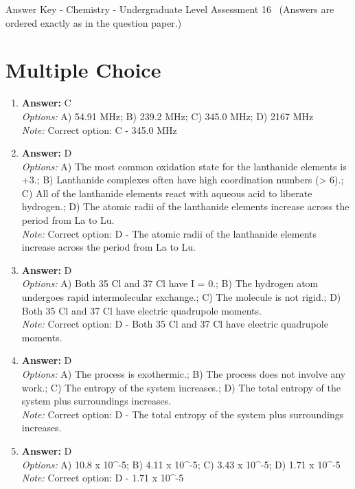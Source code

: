 \documentclass[12pt]{article}
\begin{document}
\begin{center}
Answer Key - Chemistry - Undergraduate Level Assessment 16 \
\small (Answers are ordered exactly as in the question paper.)
\end{center}

\section*{Multiple Choice}
\begin{enumerate}[label=\arabic*.]
\item \textbf{Answer:} C
\\ \textit{Options:} A) 54.91 MHz; B) 239.2 MHz; C) 345.0 MHz; D) 2167 MHz
\\ \textit{Note:} Correct option: C - 345.0 MHz
\item \textbf{Answer:} D
\\ \textit{Options:} A) The most common oxidation state for the lanthanide elements is +3.; B) Lanthanide complexes often have high coordination numbers (\textgreater{} 6).; C) All of the lanthanide elements react with aqueous acid to liberate hydrogen.; D) The atomic radii of the lanthanide elements increase across the period from La to Lu.
\\ \textit{Note:} Correct option: D - The atomic radii of the lanthanide elements increase across the period from La to Lu.
\item \textbf{Answer:} D
\\ \textit{Options:} A) Both 35 Cl and 37 Cl have I = 0.; B) The hydrogen atom undergoes rapid intermolecular exchange.; C) The molecule is not rigid.; D) Both 35 Cl and 37 Cl have electric quadrupole moments.
\\ \textit{Note:} Correct option: D - Both 35 Cl and 37 Cl have electric quadrupole moments.
\item \textbf{Answer:} D
\\ \textit{Options:} A) The process is exothermic.; B) The process does not involve any work.; C) The entropy of the system increases.; D) The total entropy of the system plus surroundings increases.
\\ \textit{Note:} Correct option: D - The total entropy of the system plus surroundings increases.
\item \textbf{Answer:} D
\\ \textit{Options:} A) 10.8 x 10^-5; B) 4.11 x 10^-5; C) 3.43 x 10^-5; D) 1.71 x 10^-5
\\ \textit{Note:} Correct option: D - 1.71 x 10^-5
\end{enumerate}
\end{document}
